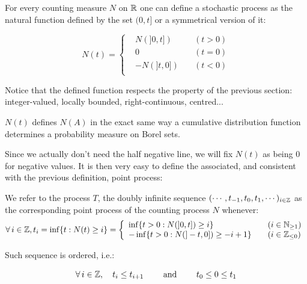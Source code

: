 \documentclass[11pt]{book}
\begin{document}
\begin{definition}
For every counting measure $N$ on $\mathbb{R}$ one can define a stochastic process as the natural function defined by the set $(0,t]$ or a symmetrical version of it:

$$N(t) = \left\{
    \begin{array}{lll}
         &N \left ( ]0,t] \right ) \quad &(t > 0)  \\
         &0 \quad &(t= 0)   \\
         &- N \left ( ]t,0] \right ) \quad &(t < 0) \\
    \end{array}
\right. $$
\end{definition}


Notice that the defined function respects the property of the previous section: integer-valued, locally bounded, right-continuous, centred...

\begin{remarque}
$N(t)$ defines $N(A)$ in the exact same way a cumulative distribution function determines a probability measure on Borel sets.
\end{remarque}

Since we actually don't need the half negative line, we will fix $N(t)$ as being $0$ for negative values. It is then very easy to define the associated, and consistent with the previous definition, point process:

\begin{definition}
We refer to the process $T$, the doubly infinite sequence $( \cdots, t_{-1}, t_0, t_1, \cdots)_{i \in \mathbb{Z}}$ as the corresponding point process of the counting process $N$ whenever:
\begin{equation}
\forall i \in \Z, t_i = \inf \{ t : N(t) \geq i \} = \left\{
    \begin{array}{ll}
           \inf \{ t > 0 : N( ]0,t] ) \geq i \} \quad &( i \in \mathbb N_{\geq 1})  \\
          - \inf \{ t > 0 : N( ]-t, 0] ) \geq -i+1 \} \quad &(i \in \mathbb Z_{\leq 0}) \\
    \end{array}
\right. 
\end{equation}
\end{definition}

Such sequence is ordered, i.e.:

$$ \forall i \in \Z, \quad t_i \leq t_{i+1} \qquad \text{ and } \qquad t_0 \leq 0 \leq t_1 $$
\end{document}
